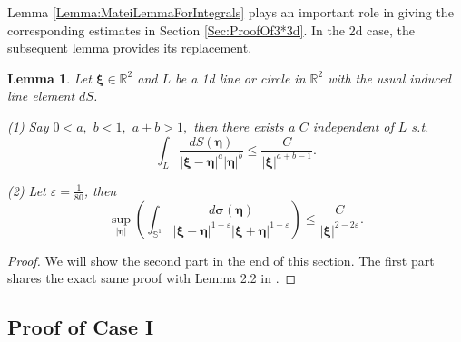 \documentclass[reqno]{amsart}
\theoremstyle{plain}
\newtheorem{lemma}{Lemma}
\numberwithin{equation}{section}
\begin{document}
Lemma \ref{Lemma:MateiLemmaForIntegrals} plays an important role in giving
the corresponding estimates in Section \ref{Sec:ProofOf3*3d}. In the 2d
case, the subsequent lemma provides its replacement.

\begin{lemma}
\label{Lemma:KeyLemmaFor3*2d}Let $\mathbf{\xi }\in \mathbb{R}^{2}$ and $L$
be a 1d line or circle in $\mathbb{R}^{2}$ with the usual induced line
element $dS$.

(1) Say $0<a,$ $b<1,$ $a+b>1,$ then there exists a $C$ independent of $L$
s.t.\begin{equation*}
\int_{L}\frac{dS(\mathbf{\eta })}{\left\vert \mathbf{\xi }-\mathbf{\eta }\right\vert ^{a}\left\vert \mathbf{\eta }\right\vert ^{b}}\leqslant \frac{C}{\left\vert \mathbf{\xi }\right\vert ^{a+b-1}}.
\end{equation*}

(2) Let $\varepsilon =\frac{1}{80}$, then 
\begin{equation*}
\sup_{\left\vert \mathbf{\eta }\right\vert }\left( \int_{\mathbb{S}^{1}}\frac{d\mathbf{\sigma (\eta )}}{\left\vert \mathbf{\xi }-\mathbf{\eta }\right\vert ^{1-\varepsilon }\left\vert \mathbf{\xi }+\mathbf{\eta }\right\vert ^{1-\varepsilon }}\right) \leqslant \frac{C}{\left\vert \mathbf{\xi }\right\vert ^{2-2\varepsilon }}.
\end{equation*}
\end{lemma}

\begin{proof}
We will show the second part in the end of this section. The first part
shares the exact same proof with Lemma 2.2 in \cite{KlainermanAndMachedon}.
\end{proof}

\subsection{Proof of Case I}
\end{document}
